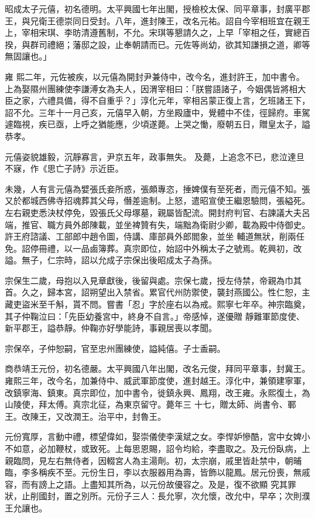 \begin{pinyinscope}
 昭成太子元僖，初名德明。太平興國七年出閣，授檢校太保、同平章事，封廣平郡王，與兄衛王德崇同日受封。八年，進封陳王，改名元祐。詔自今宰相班宜在親王上，宰相宋琪、李昉清遵舊制，不允。宋琪等懇請久之，上早「宰相之任，實總百揆，與群司禮絕；藩邸之設，止奉朝請而已。元佐等尚幼，欲其知謙損之道，卿等無固讓也。」



 雍
 熙二年，元佐被疾，以元僖為開封尹兼侍中，改今名，進封許王，加中書令。上為娶隰州團練使李謙溥女為夫人，因渭宰相曰：「朕嘗語諸子，今姻偶皆將相大臣之家，六禮具備，得不自重乎？」淳化元年，宰相呂蒙正復上言，乞班諸王下，詔不允。三年十一月己亥，元僖早入朝，方坐殿廬中，覺體中不佳，徑歸府。車駕遽臨視，疾已亟，上呼之猶能應，少頃遂薨。上哭之慟，廢朝五日，贈皇太子，謚恭孝。



 元僖姿貌雄毅，沉靜寡言，尹京五年，政事無失。
 及薨，上追念不已，悲泣達旦不寐，作《思亡子詩》示近臣。



 未幾，人有言元僖為嬖張氏妾所惑，張頗專恣，捶婢僕有至死者，而元僖不知。張又於都城西佛寺招魂葬其父母，僭差逾制。上怒，遣昭宣使王繼恩驗問，張縊死。左右親吏悉決杖停免，毀張氏父母塚墓，親屬皆配流。開封府判官、右諫議大夫呂端，推官、職方員外郎陳載，並坐裨贊有失，端黜為衛尉少卿，載為殿中侍御史。許王府諮議、工部郎中趙令圖，侍講、庫部員外郎閻象，並坐
 輔道無狀，削兩任免。詔停冊禮，以一品鹵簿葬。真宗即位，始詔中外稱太子之號焉。乾興初，改謚。無子，仁宗時，詔以允成子宗保出後昭成太子為孫。



 宗保生二歲，母抱以入見章獻後，後留與處。宗保七歲，授左侍禁，帝親為巾其首。久之，歸本宮，詔朔望出入禁省。累官代州防禦使，襲封燕國公。性仁恕，主藏吏盜米至千斛，貰不問。嘗書「忍」字於座右以為戒。熙寧七年卒。神宗臨奠，其子仲鞠泣曰：「先臣幼養宮中，終身不自言。」帝感悼，遂優贈
 靜難軍節度使、新平郡王，謚恭靜。仲鞠亦好學能詩，事親居喪以孝聞。



 宗保卒，子仲恕嗣，官至忠州團練使，謚純僖。子士盉嗣。



 商恭靖王元份，初名德嚴。太平興國八年出閣，改名元俊，拜同平章事，封冀王。雍熙三年，改今名，加兼侍中、威武軍節度使，進封越王。淳化中，兼領建寧軍，改鎮寧海、鎮東。真宗即位，加中書令，徙鎮永興、鳳翔，改王雍。永熙復土，為山陵使，拜太傅。真宗北征，為東京留守。薨年三
 十七，贈太師、尚書令、鄆王。改陳王，又改潤王。治平中，封魯王。



 元份寬厚，言動中禮，標望偉如，娶崇儀使李漢斌之女。李悍妒慘酷，宮中女婢小不如意，必加鞭杖，或致死。上每思恩賜，詔令均給，李盡取之。及元份臥病，上親臨問，見左右無侍者，因輟宮人為主湯劑。初，太宗崩，戚里皆赴禁中，朝晡臨，李多稱疾不至。元份生日，李以衣服器用為壽，皆飾以龍鳳。居元份喪，無戚容，而有謗上之語。上盡知其所為，以元份故優容之。及是，復不欲顯
 究其罪狀，止削國封，置之別所。元份子三人：長允寧，次允懷，改允中，早卒；次則濮王允讓也。




\end{pinyinscope}
